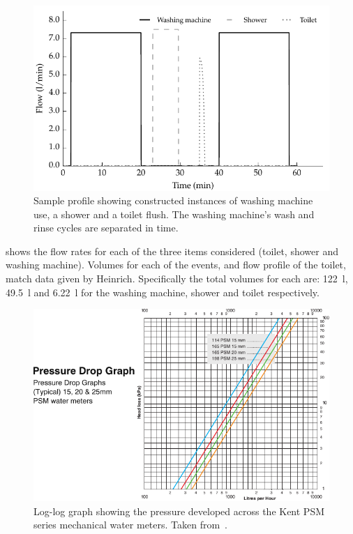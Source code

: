     \begin{figure}
      \centering
      \includegraphics[width=\linewidth]{content/pt1/02-WirelessWaterMeter/graphics/graph_profile}
      \caption{
          Sample profile showing constructed instances of washing machine use, a shower and a toilet flush.
          The washing machine's wash and rinse cycles are separated in time.}
      \label{fig:profileSample}
    \end{figure}

     shows the flow rates for each of the three items considered (toilet, shower and washing machine).
    Volumes for each of the events, and flow profile of the toilet, match data given by Heinrich.
    Specifically the total volumes for each are: \SI{122}{\litre}, \SI{49.5}{\litre} and \SI{6.22}{\litre} for the washing machine, shower and toilet respectively.

    \begin{figure}
        \centering
        \includegraphics[width=\linewidth]{content/pt1/02-WirelessWaterMeter/graphics/Kent-PSM-HeadLoss}
        \caption{
            \label{fig:headloss}
            Log-log graph showing the pressure developed across the Kent PSM series mechanical water meters. Taken from~\cite{Elster2008}.
        }
    \end{figure}


